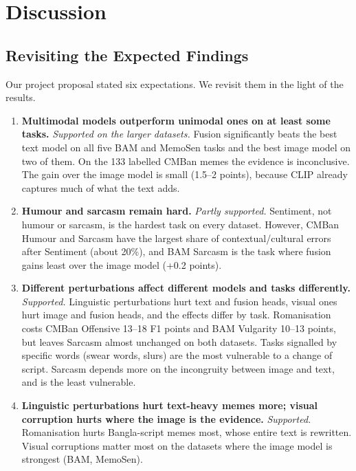 \section{Discussion}
\label{sec:discussion}

\subsection{Revisiting the Expected Findings}
Our project proposal stated six expectations. We revisit them in the light of the results.

\begin{enumerate}
  \item \textbf{Multimodal models outperform unimodal ones on at least some tasks.} \emph{Supported on the larger
  datasets.} Fusion significantly beats the best text model on all five BAM and MemoSen tasks and the best image
  model on two of them. On the 133 labelled CMBan memes the evidence is inconclusive. The gain over the image model
  is small (1.5--2 points), because CLIP already captures much of what the text adds.

  \item \textbf{Humour and sarcasm remain hard.} \emph{Partly supported.} Sentiment, not humour or sarcasm, is the
  hardest task on every dataset. However, CMBan Humour and Sarcasm have the largest share of contextual/cultural
  errors after Sentiment (about 20\%), and BAM Sarcasm is the task where fusion gains least over the image model
  (+0.2 points).

  \item \textbf{Different perturbations affect different models and tasks differently.} \emph{Supported.}
  Linguistic perturbations hurt text and fusion heads, visual ones hurt image and fusion heads, and the effects
  differ by task. Romanisation costs CMBan Offensive 13--18 F1 points and BAM Vulgarity 10--13 points, but leaves
  Sarcasm almost unchanged on both datasets. Tasks signalled by specific words (swear words, slurs) are the most
  vulnerable to a change of script. Sarcasm depends more on the incongruity between image and text, and is the least
  vulnerable.

  \item \textbf{Linguistic perturbations hurt text-heavy memes more; visual corruption hurts where the image is the
  evidence.} \emph{Supported.} Romanisation hurts Bangla-script memes most, whose entire text is rewritten. Visual
  corruptions matter most on the datasets where the image model is strongest (BAM, MemoSen).


\end{enumerate}
